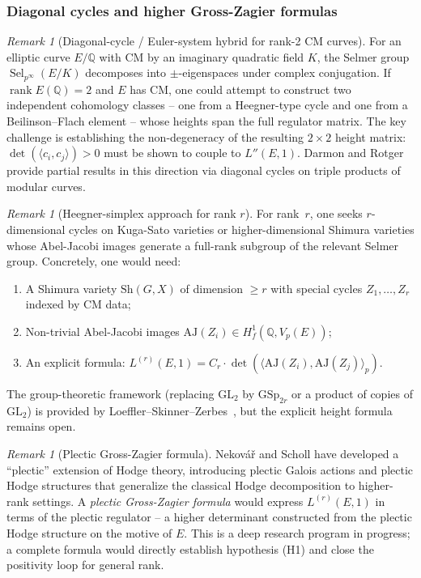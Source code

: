 \documentclass[aps,prd,twocolumn,superscriptaddress,nofootinbib]{revtex4-2}
\theoremstyle{definition}
\theoremstyle{remark}
\newtheorem{remark}[theorem]{Remark}
\DeclareMathOperator{\rank}{rank}
\DeclareMathOperator{\Sel}{Sel}
\begin{document}
\subsubsection{Diagonal cycles and higher Gross-Zagier formulas}

\begin{remark}[Diagonal-cycle / Euler-system hybrid for rank-2 CM curves]
\label{rem:diagonal-euler}
For an elliptic curve $E/\mathbb{Q}$ with CM by an imaginary quadratic field $K$, the Selmer group $\Sel_{p^\infty}(E/K)$ decomposes into $\pm$-eigenspaces under complex conjugation. If $\rank E(\mathbb{Q}) = 2$ and $E$ has CM, one could attempt to construct two independent cohomology classes -- one from a Heegner-type cycle and one from a Beilinson--Flach element -- whose heights span the full regulator matrix. The key challenge is establishing the non-degeneracy of the resulting $2 \times 2$ height matrix: $\det(\langle c_i, c_j \rangle) > 0$ must be shown to couple to $L''(E,1)$. Darmon and Rotger~\cite{DarmonRotger2017} provide partial results in this direction via diagonal cycles on triple products of modular curves.
\end{remark}

\begin{remark}[Heegner-simplex approach for rank $r$]
\label{rem:heegner-simplex}
For rank~$r$, one seeks $r$-dimensional cycles on Kuga-Sato varieties or higher-dimensional Shimura varieties whose Abel-Jacobi images generate a full-rank subgroup of the relevant Selmer group. Concretely, one would need:
\begin{enumerate}
\item A Shimura variety $\mathrm{Sh}(G, X)$ of dimension $\geq r$ with special cycles $Z_1, \ldots, Z_r$ indexed by CM data;
\item Non-trivial Abel-Jacobi images $\mathrm{AJ}(Z_i) \in H^1_f(\mathbb{Q}, V_p(E))$;
\item An explicit formula: $L^{(r)}(E,1) = C_r \cdot \det(\langle \mathrm{AJ}(Z_i), \mathrm{AJ}(Z_j) \rangle_p)$.
\end{enumerate}
The group-theoretic framework (replacing $\mathrm{GL}_2$ by $\mathrm{GSp}_{2r}$ or a product of copies of $\mathrm{GL}_2$) is provided by Loeffler--Skinner--Zerbes~\cite{LSZ2020}, but the explicit height formula remains open.
\end{remark}

\begin{remark}[Plectic Gross-Zagier formula]
\label{rem:plectic-gz}
Nekov\'a\v{r} and Scholl have developed a ``plectic'' extension of Hodge theory, introducing plectic Galois actions and plectic Hodge structures that generalize the classical Hodge decomposition to higher-rank settings. A \textit{plectic Gross-Zagier formula} would express $L^{(r)}(E,1)$ in terms of the plectic regulator -- a higher determinant constructed from the plectic Hodge structure on the motive of $E$. This is a deep research program in progress; a complete formula would directly establish hypothesis (H1) and close the positivity loop for general rank.
\end{remark}
\end{document}

